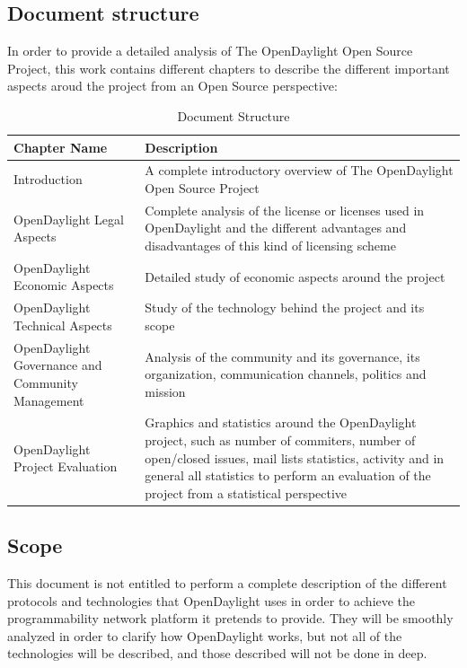 \documentclass[a4paper, 12pt]{book}
\begin{document}
\subsection{Document structure}

In order to provide a detailed analysis of The OpenDaylight Open Source Project, this work contains different chapters to describe the different important aspects aroud the project from an Open Source perspective:

\begin{table}[H]
\footnotesize
\begin{center}
\begin{tabular}{|p{5cm}|p{10cm}|}
\hline
\textbf{Chapter Name} & \textbf{Description} \\ \hline
Introduction & A complete introductory overview of The OpenDaylight Open Source Project \\
\hline
OpenDaylight Legal Aspects & Complete analysis of the license or licenses used in OpenDaylight and the different advantages and disadvantages of this kind of licensing scheme \\
\hline
OpenDaylight Economic Aspects & Detailed study of economic aspects around the project \\
\hline
OpenDaylight Technical Aspects & Study of the technology behind the project and its scope \\
\hline
OpenDaylight Governance and Community Management & Analysis of the community and its governance, its organization, communication channels, politics and mission  \\
\hline
OpenDaylight Project Evaluation & Graphics and statistics around the OpenDaylight project, such as number of commiters, number of open/closed issues, mail lists statistics, activity and in general all statistics to perform an evaluation of the project from a statistical perspective \\
\hline
\end{tabular}
\end{center}
\caption{Document Structure}
\label{tab:documentstructure}
\end{table}

\subsection{Scope}
\label{subsec:scope}
This document is not entitled to perform a complete description of the different protocols and technologies that OpenDaylight uses in order to achieve the programmability network platform it pretends to provide. They will be smoothly analyzed in order to clarify how OpenDaylight works, but not all of the technologies will be described, and those described will not be done in deep.
\end{document}
